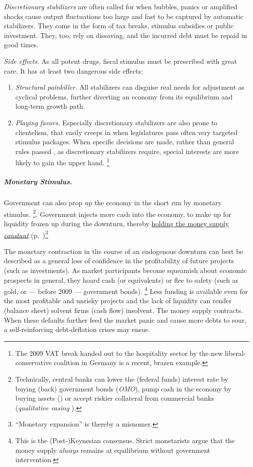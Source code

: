 \emph{Discretionary stabilizers}
are often called for when bubbles, panics or amplified shocks cause output fluctuations too large and fast to be captured by automatic stabilizers.
They come in the form of tax breaks, stimulus subsidies or public investment.
They, too, rely on dissaving, and the incurred debt must be repaid in good times.

\emph{Side effects.}
As all potent drugs, fiscal stimulus must be prescribed with great care.
It has at least two dangerous side effects:
\begin{enumerate}
	\item \emph{Structural painkiller.}
	All stabilizers can disguise real needs for adjustment as cyclical problems, further diverting an economy from its equilibrium and long-term growth path.

	\item \emph{Playing favors.}
	Especially discretionary stabilizers are also prone to clientelism, that easily creeps in when legislatures pass often very targeted stimulus packages.
	When specific decisions are made, rather than general rules passed \citep{Weber-1918-aa}, as discretionary stabilizers require, special interests are more likely to gain the upper hand.
	\footnote{
		The 2009 \gls{VAT} break handed out to the hospitality sector by the new liberal-conservative coalition in Germany is a recent, brazen example.
	}
\end{enumerate}

\subparagraph{Monetary Stimulus.}
	 \label{sec:monetary-stimulus}
Government can also prop up the economy in the short run by monetary stimulus.
\footnote{
	Technically, central banks can lower the (federal funds) interest rate by buying (back) government bonds (\emph{\gls{OMO}}), pump cash in the economy by buying assets () or accept riskier collateral from commercial banks (\emph{qualitative easing} \citep{Buiter2008}).}.
	Government injects more cash into the economy, to make up for liquidity frozen up during the downturn, thereby \hyperref[sec:price-stability]{holding the money supply \emph{constant}} (p.~\pageref{sec:price-stability})\footnote{
	``Monetary expansion'' is thereby a misnomer.
}

The monetary contraction in the course of an endogenous downturn can best be described as a general loss of confidence in the profitability of future projects (such as investments).
As market participants become squeamish about economic prospects in general, they hoard cash (or equivalents) or flee to safety (such as gold, or --- before 2009 --- government bonds).
\footnote{
	This is the (Post-)Keynesian consensus.
	Strict monetarists argue that the money supply \emph{always} remains at equilibrium without government intervention.
}
Less funding is available even for the most profitable and unrisky projects and the lack of liquidity can render (balance sheet) solvent firms (cash flow) insolvent.
The money supply contracts.
When these defaults further feed the market panic and cause more debts to sour, a self-reinforcing debt-deflation crises may ensue.

